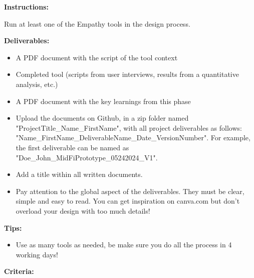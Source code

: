 \makeheaderfiles

\textbf{Instructions:}

Run at least one of the Empathy tools in the design process.

\textbf{Deliverables:}

\begin{itemize}
\item A PDF document with the script of the tool context
\item Completed tool (scripts from user interviews, results from a quantitative analysis, etc.)
\item A PDF document with the key learnings from this phase
\item Upload the documents on Github, in a zip folder named "ProjectTitle\_Name\_FirstName", with all project deliverables as follows: "Name\_FirstName\_DeliverableName\_Date\_VersionNumber".  For example, the first deliverable can be named as "Doe\_John\_MidFiPrototype\_05242024\_V1".
\item Add a title within all written documents.
\item Pay attention to the global aspect of the deliverables. They must be clear, simple and easy to read. You can get inspiration on canva.com but don't overload your design with too much details!
\end{itemize}

\textbf{Tips:}

\begin{itemize}
\item Use as many tools as needed, be make sure you do all the process in 4 working days!
\end{itemize}

\textbf{Criteria:}

